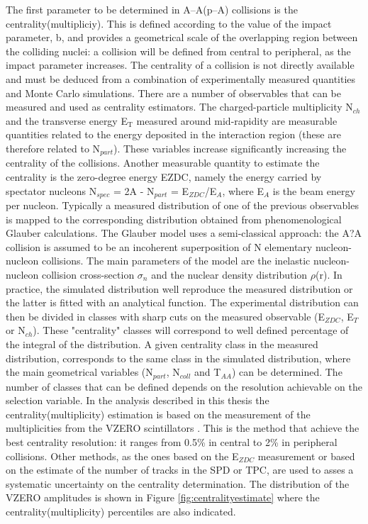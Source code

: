 The first parameter to be determined in A--A(p--A) collisions is the centrality(multipliciy). This is defined according to the value of the impact parameter, b, and provides a geometrical scale of the overlapping region between the colliding nuclei: a collision will be defined from central to peripheral, as the impact parameter increases. The centrality of a collision is not directly available and must be deduced from a combination of experimentally measured quantities and Monte Carlo simulations.
There are a number of observables that can be measured and used as centrality estimators. The charged-particle multiplicity N$_{ch}$ and the transverse energy E$_{\mathrm{T}}$ measured around mid-rapidity are measurable quantities related to the energy deposited in the interaction region (these are therefore related to N$_{part}$). These variables increase significantly increasing the centrality of the collisions. Another measurable quantity to estimate the centrality is the zero-degree energy EZDC, namely the energy carried by spectator nucleons N$_{spec}$ = 2A - N$_{part}$ = E$_{ZDC}$/E$_{A}$, where E$_{A}$ is the beam energy per nucleon.
Typically a measured distribution of one of the previous observables is mapped to the corresponding distribution obtained from phenomenological Glauber calculations. The Glauber model \cite{cite:glauber,cite:glauber1} uses a semi-classical approach: the A?A collision is assumed to be an incoherent superposition of N elementary nucleon- nucleon collisions. The main parameters of the model are the inelastic nucleon- nucleon collision cross-section  $\sigma_{n}$ and the nuclear density distribution $\rho$(r). In practice, the simulated distribution well reproduce the measured distribution or the latter is fitted with an analytical function. The experimental distribution can then be divided in classes with sharp cuts on the measured observable (E$_{ZDC}$, E$_{T}$ or N$_{ch}$). These "centrality" classes will correspond to well defined percentage of the integral of the distribution. A given centrality class in the measured distribution, corresponds to the same class in the simulated distribution, where the main geometrical variables (N$_{part}$, N$_{coll}$ and T$_{AA}$) can be determined. The number of classes that can be defined depends on the resolution achievable on the selection variable.
In the analysis described in this thesis the centrality(multiplicity) estimation is based on the measurement of the multiplicities from the VZERO scintillators \cite{cite:centralitypPb}\cite{cite:centralityPbPb}. This is the method that achieve the best centrality resolution: it ranges from 0.5\% in central to 2\% in peripheral collisions. Other methods, as the ones based on the E$_{ZDC}$ measurement or based on the estimate of the number of tracks in the SPD or TPC, are used to asses a systematic uncertainty on the centrality determination.
The distribution of the VZERO amplitudes is shown in Figure \ref{fig:centralityestimate} where the centrality(multiplicity) percentiles are also indicated. 

